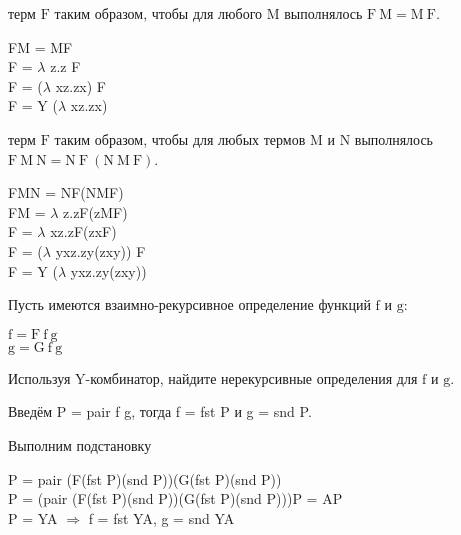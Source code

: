 \documentclass[a4paper,12pt]{article} %
\begin{document}
\begin{enumerate}
\begin{itemize}
{\item терм $\mathrm{F}$ таким образом, чтобы для любого $\mathrm{M}$ выполнялось $\mathrm{F \ M = M \ F}$.}

{\color{blue}
	\begin{adjustwidth}{1em}{0pt}
	FM = MF \\
	F = $\lambda$ z.z F \\
	F = ($\lambda$ xz.zx) F \\
	F = $\mathrm{Y}$ ($\lambda$ xz.zx)
	\end{adjustwidth}
}

{\item терм $\mathrm{F}$ таким образом, чтобы для любых термов $\mathrm{M}$ и $\mathrm{N}$ выполнялось $\mathrm{F \ M \ N = N \ F \ (N \ M \ F)}$.}


{\color{blue}
	\begin{adjustwidth}{1em}{0pt}
	FMN = NF(NMF) \\
	FM = $\lambda$ z.zF(zMF) \\
	F = $\lambda$ xz.zF(zxF) \\
	F = ($\lambda$ yxz.zy(zxy)) F \\
	F = $\mathrm{Y}$ ($\lambda$ yxz.zy(zxy))
	\end{adjustwidth}
}

\end{itemize}


{\item Пусть имеются взаимно-рекурсивное определение функций $\mathrm{f}$ и $\mathrm{g}$:
	\begin{center}
		$\mathrm{f = F \ f \ g}$ \\
		$\mathrm{g = G \ f \ g}$
	\end{center}
	Используя Y-комбинатор, найдите нерекурсивные определения для $\mathrm{f}$ и $\mathrm{g}$.
}

{\color{blue}
	\begin{adjustwidth}{1em}{0pt}
	Введём P = pair f g, тогда f = fst P и g = snd P.
    
	Выполним подстановку
    
	P = pair (F(fst P)(snd P))(G(fst P)(snd P)) \\
	P = (pair (F(fst P)(snd P))(G(fst P)(snd P)))P = AP \\
	P = YA $\Rightarrow$ f = fst YA, g = snd YA
	\end{adjustwidth}
}

\end{enumerate}
\end{document}
